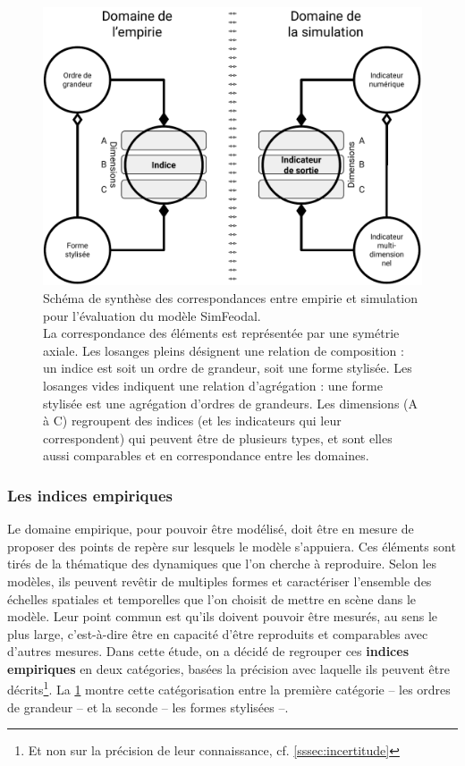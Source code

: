 \begin{figure}[H]
	\captionsetup{width=\linewidth}
	\includegraphics[width=\linewidth]{img/schema_indice_indicateur.pdf}
	\caption{Schéma de synthèse des correspondances entre empirie et simulation pour l'évaluation du modèle SimFeodal.\\
		La correspondance des éléments est représentée par une symétrie axiale.
		Les losanges pleins désignent une relation de composition :
un indice est soit un ordre de grandeur, soit une forme stylisée.
Les losanges vides indiquent une relation d'agrégation :
une forme stylisée est une agrégation d'ordres de grandeurs.
		Les dimensions (A à C) regroupent des indices (et les indicateurs qui leur correspondent) qui peuvent être de plusieurs types, et sont elles aussi comparables et en correspondance entre les domaines.
} 
	\label{fig:schema_indices} 
\end{figure}


\subsubsection{Les indices empiriques}

Le domaine empirique, pour pouvoir être modélisé, doit être en mesure de proposer des \og points de repère\fg{} sur lesquels le modèle s'appuiera.
Ces éléments sont tirés de la thématique des dynamiques que l'on cherche à reproduire.
Selon les modèles, ils peuvent revêtir de multiples formes et caractériser l'ensemble des échelles spatiales et temporelles que l'on choisit de mettre en scène dans le modèle.
Leur point commun est qu'ils doivent pouvoir être mesurés, au sens le plus large, c'est-à-dire être en capacité d'être reproduits et comparables avec d'autres mesures.
Dans cette étude, on a décidé de regrouper ces \textbf{indices empiriques} en deux catégories, basées la précision avec laquelle ils peuvent être décrits\footnote{Et non sur la précision de leur connaissance, cf. \cref{sssec:incertitude}}.
La \cref{fig:schema_indices} montre cette catégorisation entre la première catégorie -- les ordres de grandeur -- et la seconde -- les formes stylisées --.


